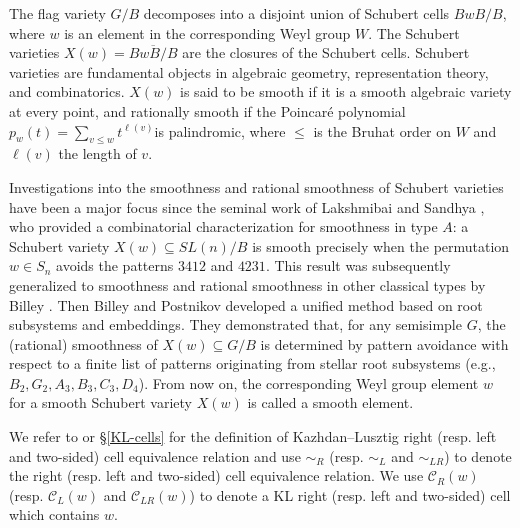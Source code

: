 \documentclass[11pt, reqno]{amsart}
\renewcommand{\subset}{\subseteq}
\theoremstyle{definition}
\numberwithin{equation}{section}
\begin{document}
 The  flag variety $G/B$ decomposes into a disjoint union of Schubert
cells $BwB/B$, where $w$  is an element in the  corresponding Weyl group $W$. The Schubert
varieties $X(w)=\overline{BwB/B}$ are the closures of the Schubert cells.
Schubert varieties are fundamental objects in algebraic geometry, representation theory, and combinatorics.  $X(w)$ is said to be  smooth if it is a smooth algebraic variety at every point, and  rationally smooth if the Poincar\'{e} polynomial $p_w(t)=\sum_{v\leq w}t^{\ell(v)}$is palindromic, where $\leq$ is the Bruhat order on $W$ and ${\ell}(v)$  the length of $v$.  


Investigations into the smoothness and rational smoothness of Schubert varieties have been a major focus since the seminal work of Lakshmibai and Sandhya \cite{LS-90}, who provided a combinatorial characterization for smoothness in type \(A\): a Schubert variety \(X(w) \subset SL(n)/B\) is smooth precisely when the permutation \(w\in S_n\) avoids the patterns $3412$ and $4231$. This result was subsequently generalized to smoothness and rational smoothness in other classical types by Billey \cite{Bi-98}. Then Billey and Postnikov \cite{BP-05} developed a unified method based on root subsystems and embeddings. They demonstrated that, for any semisimple \(G\), the (rational) smoothness of \(X(w) \subset G/B\) is determined by pattern avoidance with respect to a finite list of patterns originating from stellar root subsystems (e.g., \(B_2,G_2,A_3, B_3,C_3, D_4\)). From now on, the corresponding Weyl group  element $w$ for a smooth Schubert variety $X(w)$ is called a smooth element. 


We refer to \cite{KL79} or \S \ref{KL-cells} for the definition of Kazhdan--Lusztig right (resp. left and two-sided)  cell equivalence relation and use ${\sim}_R$ (resp. ${\sim}_L$ and ${\sim}_{LR}$)  to denote the right  (resp. left and two-sided) cell equivalence relation. We use $\mathcal{C}_R(w)$ (resp. $\mathcal{C}_L(w)$ and $\mathcal{C}_{LR}(w)$) to denote a KL right (resp. left and two-sided) cell  which contains $w$.
\end{document}
